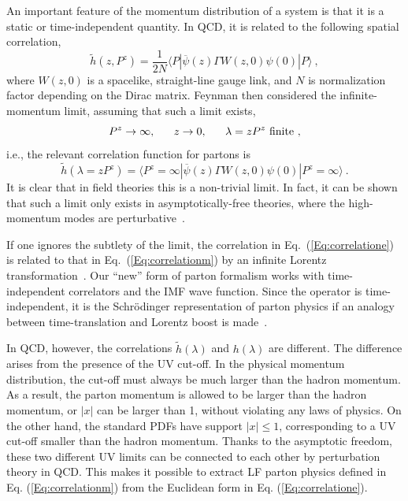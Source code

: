 \documentclass[preprint,12pt]{elsarticle}
\begin{document}
An important feature of the momentum distribution of a system is that it is a static or time-independent quantity. In QCD,
it is related to the following spatial correlation,
\begin{equation}
    \tilde h(z,P^z)= \frac{1}{2N}\langle P|\overline \psi(z)\Gamma W(z, 0)\psi(0)|P\rangle \ ,
\label{eq:esme}
\end{equation}
where $W(z,0)$ is a spacelike, straight-line gauge link, and $N$ is normalization factor depending on the Dirac matrix.
Feynman then considered the infinite-momentum limit, assuming that such a limit
exists,
\begin{equation}
  P^z \to \infty, ~~~~~z\to 0, ~~~~~\lambda = zP^z ~{\rm finite}\ ,
\end{equation}
i.e., the relevant correlation function for partons is
\begin{equation}
  \tilde h(\lambda= zP^z) = \langle P^z=\infty|\overline \psi(z)\Gamma W(z, 0)\psi(0)|P^z=\infty\rangle\ .
\label{Eq:correlatione}
\end{equation}
It is clear that in field theories this is a non-trivial limit. In fact,
it can be shown that such a limit only exists in asymptotically-free theories, where
the high-momentum modes are perturbative~\cite{Ji:2020ect}.

If one ignores the subtlety of the limit,
the correlation in Eq.~(\ref{Eq:correlatione})
is related to that  in Eq.~(\ref{Eq:correlationm})
by an infinite Lorentz transformation~\cite{Ji:2013dva}.
Our ``new'' form of parton formalism works with time-independent
correlators and the IMF wave function.
Since the operator is time-independent, it is the
Schr\"odinger representation of parton physics
if an analogy between time-translation and Lorentz boost is
made~\cite{Ji:2020ect}.

In QCD, however, the correlations $\tilde h(\lambda)$
and $h(\lambda)$ are different. The difference arises
from the presence of the UV cut-off. In the physical
momentum distribution, the cut-off must always be much
larger than the hadron momentum. As a result, the parton momentum
is allowed to be larger than the hadron momentum, or $|x|$ can be
larger than 1, without
violating any laws of physics. On the other hand, the standard PDFs
have support $|x|\le1$, corresponding to a UV cut-off smaller than
the hadron momentum. Thanks
to the asymptotic freedom, these two different UV limits
can be connected to each other by perturbation theory in QCD. This makes it possible to extract LF parton physics defined in Eq. (\ref{Eq:correlationm}) from the Euclidean form in Eq. (\ref{Eq:correlatione}).
\end{document}
